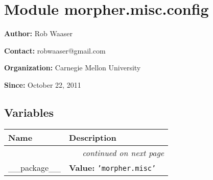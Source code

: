 %
%
%


\section{Module morpher.misc.config}

    \label{morpher:misc:config}
\textbf{Author:} Rob Waaser



\textbf{Contact:} robwaaser@gmail.com



\textbf{Organization:} Carnegie Mellon University



\textbf{Since:} October 22, 2011





  \subsection{Variables}

    \vspace{-1cm}
\hspace{\varindent}\begin{longtable}{|p{\varnamewidth}|p{\vardescrwidth}|l}
\cline{1-2}
\cline{1-2} \centering \textbf{Name} & \centering \textbf{Description}& \\
\cline{1-2}
\endhead\cline{1-2}\multicolumn{3}{r}{\small\textit{continued on next page}}\\\endfoot\cline{1-2}
\endlastfoot\raggedright \_\-\_\-p\-a\-c\-k\-a\-g\-e\-\_\-\_\- & \raggedright \textbf{Value:} 
{\tt \texttt{'}\texttt{morpher.misc}\texttt{'}}&\\
\cline{1-2}
\end{longtable}



